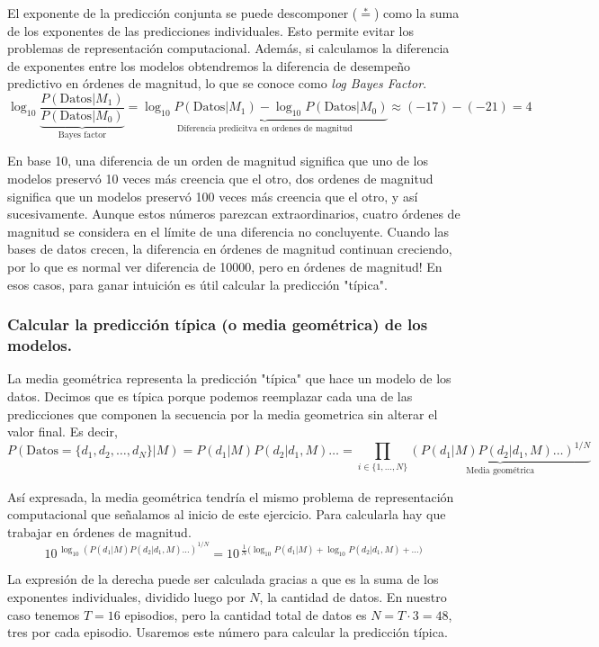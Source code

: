 \documentclass[a4paper,10pt]{article}
\begin{document}
El exponente de la predicción conjunta se puede descomponer ($\overset{*}{=}$) como la suma de los exponentes de las predicciones individuales.
Esto permite evitar los problemas de representación computacional.
Además, si calculamos la diferencia de exponentes entre los modelos obtendremos la diferencia de desempeño predictivo en órdenes de magnitud, lo que se conoce como \emph{log Bayes Factor}.
$$ \log_{10} \underbrace{\frac{P(\text{Datos}|M_1)}{P(\text{Datos}|M_0)}}_{\text{Bayes factor}}  = \underbrace{\log_{10} P(\text{Datos}|M_1) - \log_{10}P(\text{Datos}|M_0)}_{\text{Diferencia predicitva en ordenes de magnitud}} \approx (-17) - (-21) = 4$$

En base 10, una diferencia de un orden de magnitud significa que uno de los modelos preservó 10 veces más creencia que el otro, dos ordenes de magnitud significa que un modelos preservó 100 veces más creencia que el otro, y así sucesivamente.
Aunque estos números parezcan extraordinarios, cuatro órdenes de magnitud se considera en el límite de una diferencia no concluyente. Cuando las bases de datos crecen, la diferencia en órdenes de magnitud continuan creciendo, por lo que es normal ver diferencia de 10000, pero en órdenes de magnitud! En esos casos, para ganar intuición es útil calcular la predicción "típica".

\subsubsection{Calcular la predicción típica (o media geométrica) de los modelos.}

La media geométrica representa la predicción "típica" que hace un modelo de los datos. Decimos que es típica porque podemos reemplazar cada una de las predicciones que componen la secuencia por la media geometrica sin alterar el valor final. Es decir,
$$P(\text{Datos}=\{d_1, d_2, \dots, d_N \}|M) = P(d_1|M) P(d_2|d_1,M) \dots =  \prod_{i\in \{1,\dots,N\}} \underbrace{(P(d_1|M) P(d_2|d_1,M) \dots )^{1/N}}_{\text{Media geométrica}} $$

Así expresada, la media geométrica tendría el mismo problema de representación computacional que señalamos al inicio de este ejercicio. Para calcularla hay que trabajar en órdenes de magnitud.
$$ 10^{\, \log_{10} (P(d_1|M) P(d_2|d_1,M) \dots )^{1/N}} = 10^{\,\frac{1}{N}\big(\log_{10} P(d_1|M) + \log_{10} P(d_2|d_1,M) + \dots \big)}$$

La expresión de la derecha puede ser calculada gracias a que es la suma de los exponentes individuales, dividido luego por $N$, la cantidad de datos. En nuestro caso tenemos $T=16$ episodios, pero la cantidad total de datos es $N=T\cdot3 = 48$, tres por cada episodio. Usaremos este número para calcular la predicción típica.
\end{document}
